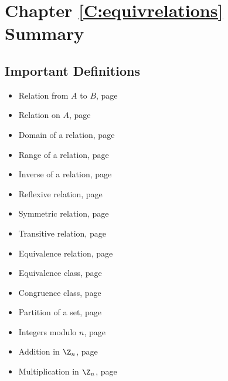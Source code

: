 \newpage
\section{Chapter \ref{C:equivrelations} Summary}
\subsection*{Important Definitions}
\begin{multicols}{2}
\begin{itemize}
\item Relation from $A$ to $B$, page~\pageref*{relation}
\item Relation on $A$, page~\pageref*{relation}
\item Domain of a relation, page~\pageref*{domrangeofrelation}
\item Range of a relation, page~\pageref*{domrangeofrelation}
\item Inverse of a relation, page~\pageref*{inverseofrelation}
\item Reflexive relation, page~\pageref*{ref-sym-trans}
\item Symmetric relation, page~\pageref*{ref-sym-trans}
\item Transitive relation, page~\pageref*{ref-sym-trans}
\item Equivalence relation, page~\pageref*{equivalencerelation}
\item Equivalence class, page~\pageref*{equivalenceclass}
\item Congruence class, page~\pageref*{congclass}
\item Partition of a set, page~\pageref*{partition}
\item Integers modulo $n$, page~\pageref*{integersmodn}
\item Addition in $\Z_n$, page~\pageref*{modulararithmetic}
\item Multiplication in $\Z_n$, page~\pageref*{modulararithmetic}
\end{itemize}
\end{multicols}
\hbreak



